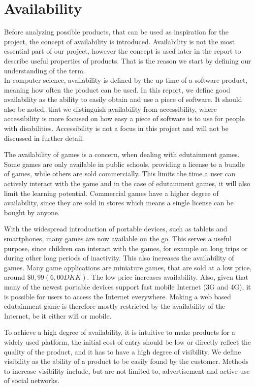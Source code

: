 \section{Availability}
\label{sec:availability}
Before analyzing possible products, that can be used as inspiration for the project, the concept of availability is introduced. Availability is not the most essential part of our project, however the concept is used later in the report to describe useful properties of products. That is the reason we start by defining our understanding of the term.\\ 

In computer science, availability is defined by the up time of a software product, meaning how often the product can be used.\cite{defAvailability}
In this report, we define good availability as the ability to easily obtain and use a piece of software.
It should also be noted, that we distinguish availability from accessibility, where accessibility is more focused on how easy a piece of software is to use for people with disabilities.
Accessibility is not a focus in this project and will not be discussed in further detail.\newline

The availability of games is a concern, when dealing with edutainment games.
Some games are only available in public schools, providing a license to a bundle of games, while others are sold commercially.
This limits the time a user can actively interact with the game and in the case of edutainment games, it will also limit the learning potential.
Commercial games have a higher degree of availability, since they are sold in stores which means a single license can be bought by anyone.\newline

With the widespread introduction of portable devices, such as tablets and smartphones, many games are now available on the go.
This serves a useful purpose, since children can interact with the games, for example on long trips or during other long periods of inactivity.
This also increases the availability of games.
Many game applications are miniature games, that are sold at a low price, around $\$0,99 (6,00 DKK)$.
The low price increases availability.
Also, given that many of the newest portable devices support fast mobile Internet (3G and 4G), it is possible for users to access the Internet everywhere.
Making a web based edutainment game is therefore mostly restricted by the availability of the Internet, be it either wifi or mobile.\newline

To achieve a high degree of availability, it is intuitive to make products for a widely used platform, the initial cost of entry should be low or directly reflect the quality of the product, and it has to have a high degree of visibility.
We define visibility as the ability of a product to be easily found by the customer.
Methods to increase visibility include, but are not limited to, advertisement and active use of social networks.